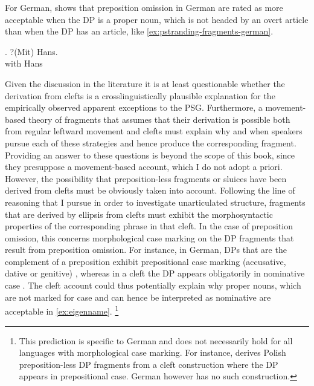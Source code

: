 For German, \citet{lemkeaccepted} shows that preposition omission in German are rated as more acceptable when the DP is a proper noun, which is not headed by an overt article \Next than when the DP has an article, like \ref{ex:pstranding-fragments-german}.\largerpage[2]

\exg. 
?(Mit) Hans.\label{ex:eigenname}\\
with Hans\\

Given the discussion in the literature it is at least questionable whether the derivation from clefts is a crosslinguistically plausible explanation for the empirically observed apparent exceptions to the PSG. Furthermore, a movement-based theory of fragments that assumes that their derivation is possible both from regular leftward movement and clefts must explain why and when speakers pursue each of these strategies and hence produce the corresponding fragment. Providing an answer to these questions is beyond the scope of this book, since they presuppose a movement-based account, which I do not adopt a priori. However, the possibility that preposition-less fragments or sluices have been derived from clefts must be obviously taken into account. Following the line of reasoning that I pursue in order to investigate unarticulated structure, fragments that are derived by ellipsis from clefts must exhibit the morphosyntactic properties of the corresponding phrase in that cleft. In the case of preposition omission, this concerns morphological case marking on the DP fragments that result from preposition omission. For instance, in German, DPs that are the complement of a preposition exhibit prepositional case marking (accusative, dative or genitive) \Next[a], whereas in a cleft the DP appears obligatorily in nominative case \Next[b]. The cleft account could thus potentially explain why proper nouns, which are not marked for case and can hence be interpreted as nominative are acceptable in \ref{ex:eigenname}.%
%
\footnote{This prediction is specific to German and does not necessarily hold for all languages with morphological case marking. For instance, \citet{szczegielniak2008} derives Polish preposition-less DP fragments from a cleft construction where the DP appears in prepositional case. German however has no such construction.}\afterfn%
